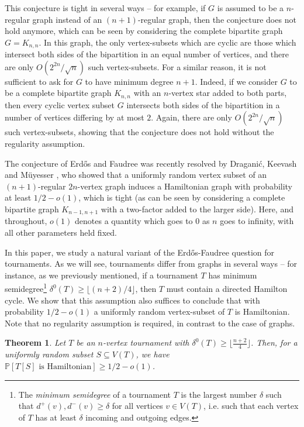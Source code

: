 \documentclass[a4paper,11pt]{article}
\newtheorem{theorem}{\bf Theorem}[section]
\theoremstyle{definition}
\def\Pb{\mathbb{P}}
\begin{document}
This conjecture is tight in several ways -- for example, if $G$ is assumed to be a $n$-regular graph instead of an $(n+1)$-regular graph, then the conjecture does not hold anymore, which can be seen by considering the complete bipartite graph $G=K_{n, n}$. In this graph, the only vertex-subsets which are cyclic are those which intersect both sides of the bipartition in an equal number of vertices, and there are only $O(2^{2n}/\sqrt{n})$ such vertex-subsets. For a similar reason, it is not sufficient to ask for $G$ to have minimum degree $n+1$. Indeed, if we consider $G$ to be a complete bipartite graph $K_{n, n}$ with an $n$-vertex star added to both parts, then every cyclic vertex subset $G$ intersects both sides of the bipartition in a number of vertices differing by at most $2$. Again, there are only $O(2^{2n}/\sqrt{n})$ such vertex-subsets, showing that the conjecture does not hold without the regularity assumption.

The conjecture of Erd\H{o}s and Faudree was recently resolved by Dragani\'c, Keevash and M\"uyesser \cite{DKM}, who showed that a uniformly random vertex subset of an $(n+1)$-regular $2n$-vertex graph induces a Hamiltonian graph with probability at least $1/2-o(1)$, which is tight (as can be seen by considering a complete bipartite graph $K_{n-1, n+1}$ with a two-factor added to the larger side). Here, and throughout, $o(1)$ denotes a quantity which goes to $0$ as $n$ goes to infinity, with all other parameters held fixed.

In this paper, we study a natural variant of the Erd\H{o}s-Faudree question for tournaments. As we will see, tournaments differ from graphs in several ways -- for instance, as we previously mentioned, if a tournament $T$ has minimum semidegree\footnote{The \textit{minimum semidegree} of a tournament $T$ is the largest number $\delta$ such that $d^+(v), d^-(v)\geq \delta$ for all vertices $v\in V(T)$, i.e. such that each vertex of $T$ has at least $\delta$ incoming and outgoing edges.} $\delta^0(T)\geq \lfloor (n+2)/4\rfloor$, then $T$ must contain a directed Hamilton cycle. We show that this assumption also suffices to conclude that with probability $1/2-o(1)$ a uniformly random vertex-subset of $T$ is Hamiltonian. Note that no regularity assumption is required, in contrast to the case of graphs.

\begin{theorem}\label{thm:special_1}
Let $T$ be an $n$-vertex tournament with $\delta^0(T)\geq \lfloor \frac{n+2}{4}\rfloor$. Then, for a uniformly random subset $S\subseteq V(T)$, we have $\Pb[T[S]\text{ is Hamiltonian}]\geq 1/2-o(1)$.
\end{theorem}
\end{document}
